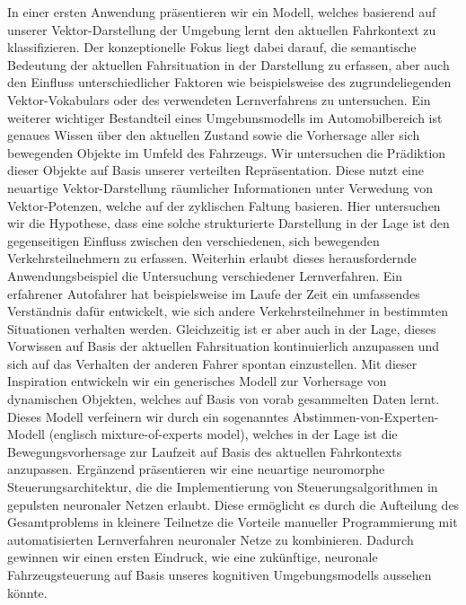In einer ersten Anwendung pr\"asentieren wir ein Modell, welches basierend auf unserer Vektor-Darstellung der Umgebung lernt den aktuellen Fahrkontext zu klassifizieren.
Der konzeptionelle Fokus liegt dabei darauf, die semantische Bedeutung der aktuellen Fahrsituation in der Darstellung zu erfassen, aber auch den Einfluss unterschiedlicher Faktoren wie beispielsweise des zugrundeliegenden Vektor-Vokabulars oder des verwendeten Lernverfahrens zu untersuchen.
Ein weiterer wichtiger Bestandteil eines Umgebunsmodells im Automobilbereich ist genaues Wissen \"uber den aktuellen Zustand sowie die Vorhersage aller sich bewegenden Objekte im Umfeld des Fahrzeugs.
Wir untersuchen die Pr\"adiktion dieser Objekte auf Basis unserer verteilten Repr\"asentation.
Diese nutzt eine neuartige Vektor-Darstellung r\"aumlicher Informationen unter Verwedung von Vektor-Potenzen, welche auf der zyklischen Faltung basieren.
Hier untersuchen wir die Hypothese, dass eine solche strukturierte Darstellung in der Lage ist den gegenseitigen Einfluss zwischen den verschiedenen, sich bewegenden Verkehrsteilnehmern zu erfassen.
Weiterhin erlaubt dieses herausfordernde Anwendungsbeispiel die Untersuchung verschiedener Lernverfahren.
Ein erfahrener Autofahrer hat beispielsweise im Laufe der Zeit ein umfassendes Verst\"andnis daf\"ur entwickelt, wie sich andere Verkehrsteilnehmer in bestimmten Situationen verhalten werden.
Gleichzeitig ist er aber auch in der Lage, dieses Vorwissen auf Basis der aktuellen Fahrsituation kontinuierlich anzupassen und sich auf das Verhalten der anderen Fahrer spontan einzustellen.
Mit dieser Inspiration entwickeln wir ein generisches Modell zur Vorhersage von dynamischen Objekten, welches auf Basis von vorab gesammelten Daten lernt.
Dieses Modell verfeinern wir durch ein sogenanntes Abstimmen-von-Experten-Modell (englisch mixture-of-experts model), welches in der Lage ist die Bewegungsvorhersage zur Laufzeit auf Basis des aktuellen Fahrkontexts anzupassen.
Erg\"anzend pr\"asentieren wir eine neuartige neuromorphe Steuerungsarchitektur, die die Implementierung von Steuerungsalgorithmen in gepulsten neuronaler Netzen erlaubt.
Diese erm\"oglicht es durch die Aufteilung des Gesamtproblems in kleinere Teilnetze die Vorteile manueller Programmierung mit automatisierten Lernverfahren neuronaler Netze zu kombinieren.
Dadurch gewinnen wir einen ersten Eindruck, wie eine zuk\"unftige, neuronale Fahrzeugsteuerung auf Basis unseres kognitiven Umgebungsmodells aussehen k\"onnte.
